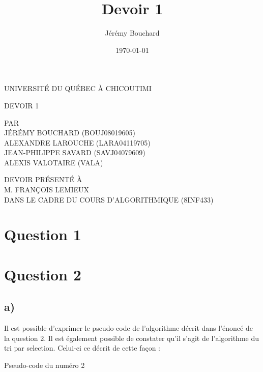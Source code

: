 \documentclass[12pt]{article}
\title{Devoir 1}
\author{Jérémy Bouchard}
\date{\today}
\begin{document}
  \begin{titlepage}
    \doublespacing
    \centering

    UNIVERSITÉ DU QUÉBEC À CHICOUTIMI \\

    \vspace{4.7cm}

    DEVOIR 1 \\

    \vspace{4.7cm}

    PAR \\
    JÉRÉMY BOUCHARD (BOUJ08019605) \\
    ALEXANDRE LAROUCHE (LARA04119705) \\
    JEAN-PHILIPPE SAVARD (SAVJ04079609) \\
    ALEXIS VALOTAIRE (VALA) \\

    \vspace{4.7cm}

    DEVOIR PRÉSENTÉ À \\
    M. FRANÇOIS LEMIEUX \\
    DANS LE CADRE DU COURS D'ALGORITHMIQUE (8INF433)

  \end{titlepage}

  \newpage

  \newpage

  \onehalfspacing

  \section*{Question 1}

  \newpage

  \section*{Question 2}
  \subsection*{a)}

    Il est possible d'exprimer le pseudo-code de l'algorithme décrit dans
    l'énoncé de la question 2. Il est également possible de constater qu'il
    s'agit de l'algorithme du tri par selection. Celui-ci ce décrit de cette
    façon : \newline

    \begin{algorithm}[H]
      \caption{Pseudo-code du numéro 2}
    \end{algorithm}
\end{document}
